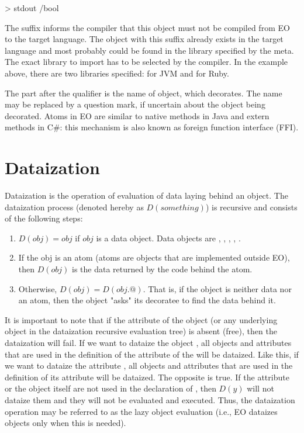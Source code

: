 \documentclass[12pt]{book}
\begin{document}
{\begin{ffcode}
[text] > stdout /bool
\end{ffcode}
The  suffix informs the compiler that this object must
not be compiled from EO to the target language. The object
with this suffix already exists in the target language and most
probably could be found in the library specified by the 
meta. The exact library to import has to be selected by the compiler. In the example above, there are two libraries specified: for JVM and for Ruby.

The  part after the \ff{/} qualifier is the name of object, which  decorates. The name may be replaced by a question mark, if uncertain about the object being decorated. Atoms in EO are similar to native methods in Java and extern methods in C\#: this mechanism is also known as foreign function interface (FFI).

\section{Dataization} \label{sec:dataization}
Dataization is the operation of evaluation of data laying behind an object. The dataization process (denoted hereby as $D(something)$) is recursive and consists of the following steps:

\begin{enumerate}
    \item $D(obj) = obj$ if $obj$ is a data object. Data objects are , , , , .
    \item If the obj is an atom (atoms are objects that are implemented outside EO), then $D(obj)$ is the data returned by the code behind the atom.
    \item Otherwise, $D(obj) = D(obj.@)$. That is, if the object is neither data nor an atom, then the object "asks" its decoratee to find the data behind it.
\end{enumerate}

It is important to note that if the  attribute of the object (or any underlying object in the dataization recursive evaluation tree) is absent (free), then the dataization will fail.
If we want to dataize the object , all objects and attributes that are used in the definition of the  attribute of the  will be dataized. Like this, if we want to dataize the attribute , all objects and attributes that are used in the definition of its  attribute will be dataized.
The opposite is true. If the attribute  or the object  itself are not used in the declaration of , then $D(y)$ will not dataize them and they will not be evaluated and executed. Thus, the dataization operation may be referred to as the lazy object evaluation (i.e., EO dataizes objects only when this is needed).


}
\end{document}
